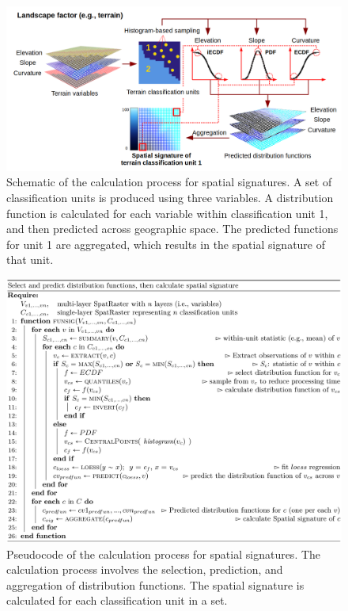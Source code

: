 \begin{figure}[H]

{\centering \includegraphics[width=0.95\linewidth,height=0.25\textheight]{figures/figure_7} 

}

\caption{Schematic of the calculation process for spatial signatures. A set of classification units is produced using three variables. A distribution function is calculated for each variable within classification unit 1, and then predicted across geographic space. The predicted functions for unit 1 are aggregated, which results in the spatial signature of that unit.}\label{fig:f7}
\end{figure}

\begin{figure}[H]

{\centering \includegraphics[width=0.95\linewidth]{figures/algorithm_1} 

}

\caption{Pseudocode of the calculation process for spatial signatures. The calculation process involves the selection, prediction, and aggregation of distribution functions. The spatial signature is calculated for each classification unit in a set.}\label{fig:f8}
\end{figure}

